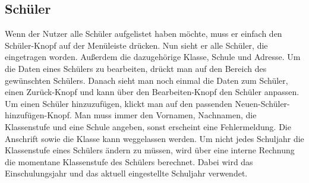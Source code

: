 \subsection{Schüler}
Wenn der Nutzer alle Schüler aufgelistet haben möchte, muss er einfach den Schüler-Knopf auf der Menüleiste drücken. Nun sieht er alle Schüler, die eingetragen worden. Außerdem die dazugehörige Klasse, Schule und Adresse. Um die Daten eines Schülers zu bearbeiten, drückt man auf den Bereich des gewünschten Schülers. Danach sieht man noch einmal die Daten zum Schüler, einen Zurück-Knopf und kann über den Bearbeiten-Knopf den Schüler anpassen. Um einen Schüler hinzuzufügen, klickt man auf den passenden Neuen-Schüler-hinzufügen-Knopf. Man muss immer den Vornamen, Nachnamen, die Klassenstufe und eine Schule angeben, sonst erscheint eine Fehlermeldung. Die Anschrift sowie die Klasse kann weggelassen werden. Um nicht jedes Schuljahr die Klassenstufe eines Schülers ändern zu müssen, wird über eine interne Rechnung die momentane Klassenstufe des Schülers berechnet. Dabei wird das Einschulungsjahr und das aktuell eingestellte Schuljahr verwendet.

